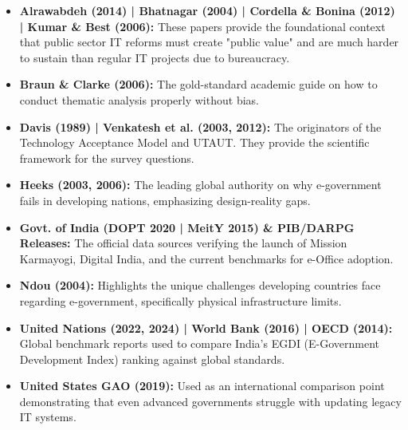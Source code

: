 \documentclass[11pt,a4paper]{article}
\begin{document}
\begin{itemize}[leftmargin=1.5em, itemsep=8pt]
    \item \textbf{Alrawabdeh (2014) | Bhatnagar (2004) | Cordella \& Bonina (2012) | Kumar \& Best (2006):} These papers provide the foundational context that public sector IT reforms must create "public value" and are much harder to sustain than regular IT projects due to bureaucracy.
    \item \textbf{Braun \& Clarke (2006):} The gold-standard academic guide on how to conduct thematic analysis properly without bias.
    \item \textbf{Davis (1989) | Venkatesh et al. (2003, 2012):} The originators of the Technology Acceptance Model and UTAUT. They provide the scientific framework for the survey questions.
    \item \textbf{Heeks (2003, 2006):} The leading global authority on why e-government fails in developing nations, emphasizing design-reality gaps.
    \item \textbf{Govt. of India (DOPT 2020 | MeitY 2015) \& PIB/DARPG Releases:} The official data sources verifying the launch of Mission Karmayogi, Digital India, and the current benchmarks for e-Office adoption.
    \item \textbf{Ndou (2004):} Highlights the unique challenges developing countries face regarding e-government, specifically physical infrastructure limits.
    \item \textbf{United Nations (2022, 2024) | World Bank (2016) | OECD (2014):} Global benchmark reports used to compare India's EGDI (E-Government Development Index) ranking against global standards.
    \item \textbf{United States GAO (2019):} Used as an international comparison point demonstrating that even advanced governments struggle with updating legacy IT systems.
\end{itemize}
\end{document}
